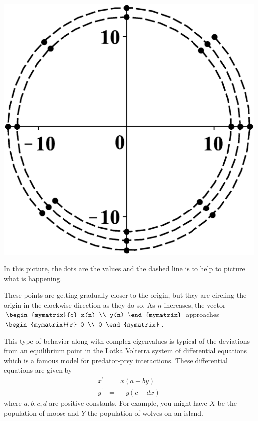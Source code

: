\begin{solution}
  \begin{center}
    \includegraphics[bb=0 0 800 800,scale=.2]{figures/4dec.eps}
  \end{center}

  In this picture, the dots are the values and the dashed line is to
  help to picture what is happening.

  These points are getting gradually closer to the origin, but they
  are circling the origin in the clockwise direction as they do so. As
  $n$ increases, the vector $\begin{mymatrix}{c}
    x(n) \\
    y(n)
  \end{mymatrix}$ approaches $ \begin{mymatrix}{r}
    0 \\
    0
  \end{mymatrix}$.
\end{solution}

This type of behavior along with complex eigenvalues is typical of the
deviations from an equilibrium point in the Lotka Volterra system of
differential equations which is a famous model for predator-prey
interactions. These differential equations are given by
\begin{eqnarray*}
  x^{\prime } &=&x(a-by) \\
  y^{\prime } &=&-y(c-dx)
\end{eqnarray*}
where $a,b,c,d$ are positive constants. For example, you might have
$X$ be the population of moose and $Y$ the population of wolves on an
island.

